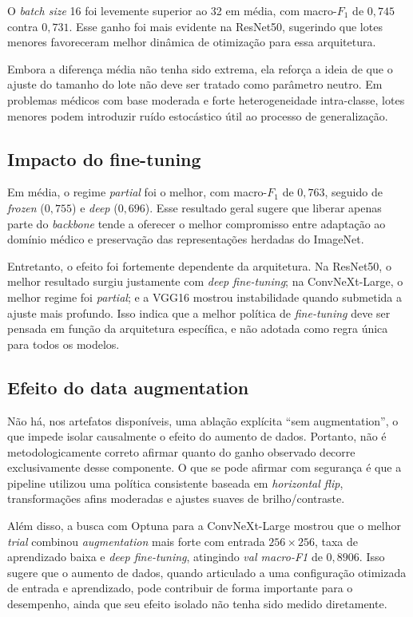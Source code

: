 \documentclass[tcc,capa]{texufpel}
\begin{document}
O \textit{batch size} 16 foi levemente superior ao 32 em média, com macro-\(F_1\) de \(0{,}745\) contra \(0{,}731\). Esse ganho foi mais evidente na ResNet50, sugerindo que lotes menores favoreceram melhor dinâmica de otimização para essa arquitetura.

Embora a diferença média não tenha sido extrema, ela reforça a ideia de que o ajuste do tamanho do lote não deve ser tratado como parâmetro neutro. Em problemas médicos com base moderada e forte heterogeneidade intra-classe, lotes menores podem introduzir ruído estocástico útil ao processo de generalização.

\subsection{Impacto do fine-tuning}

Em média, o regime \textit{partial} foi o melhor, com macro-\(F_1\) de \(0{,}763\), seguido de \textit{frozen} (\(0{,}755\)) e \textit{deep} (\(0{,}696\)). Esse resultado geral sugere que liberar apenas parte do \textit{backbone} tende a oferecer o melhor compromisso entre adaptação ao domínio médico e preservação das representações herdadas do ImageNet.

Entretanto, o efeito foi fortemente dependente da arquitetura. Na ResNet50, o melhor resultado surgiu justamente com \textit{deep fine-tuning}; na ConvNeXt-Large, o melhor regime foi \textit{partial}; e a VGG16 mostrou instabilidade quando submetida a ajuste mais profundo. Isso indica que a melhor política de \textit{fine-tuning} deve ser pensada em função da arquitetura específica, e não adotada como regra única para todos os modelos.

\subsection{Efeito do data augmentation}

Não há, nos artefatos disponíveis, uma ablação explícita “sem augmentation”, o que impede isolar causalmente o efeito do aumento de dados. Portanto, não é metodologicamente correto afirmar quanto do ganho observado decorre exclusivamente desse componente. O que se pode afirmar com segurança é que a pipeline utilizou uma política consistente baseada em \textit{horizontal flip}, transformações afins moderadas e ajustes suaves de brilho/contraste.

Além disso, a busca com Optuna para a ConvNeXt-Large mostrou que o melhor \textit{trial} combinou \textit{augmentation} mais forte com entrada \(256\times256\), taxa de aprendizado baixa e \textit{deep fine-tuning}, atingindo \textit{val macro-F1} de \(0{,}8906\). Isso sugere que o aumento de dados, quando articulado a uma configuração otimizada de entrada e aprendizado, pode contribuir de forma importante para o desempenho, ainda que seu efeito isolado não tenha sido medido diretamente.
\end{document}
